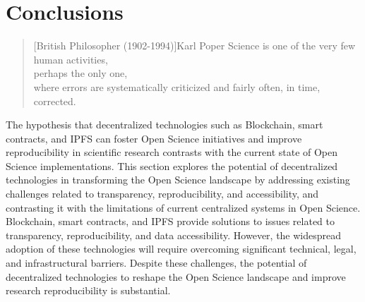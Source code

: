 \documentclass[final]{rc-book-2.14}
\begin{document}
\chapter{Conclusions}
\label{chp:conclusions}

\begin{quotation}[British Philosopher (1902-1994)]{Karl Poper}
    Science is one of the very few human activities, \\
    perhaps the only one, \\
    where errors are systematically criticized and fairly often, in time, corrected.
\end{quotation}



\drop The hypothesis that decentralized technologies such as Blockchain, smart contracts, and IPFS can foster Open Science initiatives and improve reproducibility in scientific research contrasts with the current state of Open Science implementations. This section explores the potential of decentralized technologies in transforming the Open Science landscape by addressing existing challenges related to transparency, reproducibility, and accessibility, and contrasting it with the limitations of current centralized systems in Open Science. Blockchain, smart contracts, and IPFS provide solutions to issues related to transparency, reproducibility, and data accessibility. However, the widespread adoption of these technologies will require overcoming significant technical, legal, and infrastructural barriers. Despite these challenges, the potential of decentralized technologies to reshape the Open Science landscape and improve research reproducibility is substantial.

\end{document}
